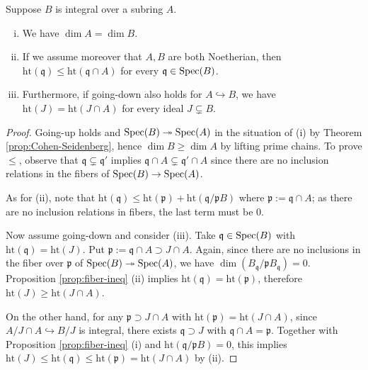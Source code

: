 \begin{proposition}\label{prop:dim-integral}
	Suppose $B$ is integral over a subring $A$.
	\begin{enumerate}[(i)]
		\item We have $\dim A = \dim B$.
		\item If we assume moreover that $A, B$ are both Noetherian, then $\mathrm{ht}(\mathfrak{q}) \leq \mathrm{ht}(\mathfrak{q} \cap A)$ for every $\mathfrak{q} \in \operatorname{Spec}(B)$.
		\item Furthermore, if going-down also holds for $A \hookrightarrow B$, we have $\mathrm{ht}(J) = \mathrm{ht}(J \cap A)$ for every ideal $J \subsetneq B$.
	\end{enumerate}
\end{proposition}
\begin{proof}
	Going-up holds and $\operatorname{Spec}(B) \twoheadrightarrow \operatorname{Spec}(A)$ in the situation of (i) by Theorem \ref{prop:Cohen-Seidenberg}, hence $\dim B \geq \dim A$ by lifting prime chains. To prove $\leq$, observe that $\mathfrak{q} \subsetneq \mathfrak{q}'$ implies $\mathfrak{q} \cap A \subsetneq \mathfrak{q}' \cap A$ since there are no inclusion relations in the fibers of $\operatorname{Spec}(B) \to \operatorname{Spec}(A)$.

	As for (ii), note that $\text{ht}(\mathfrak{q}) \leq \text{ht}(\mathfrak{p}) + \text{ht}(\mathfrak{q}/\mathfrak{p}B)$ where $\mathfrak{p} := \mathfrak{q} \cap A$; as there are no inclusion relations in fibers, the last term must be $0$.
	
	Now assume going-down and consider (iii). Take $\mathfrak{q} \in \operatorname{Spec}(B)$ with $\text{ht}(\mathfrak{q}) = \text{ht}(J)$. Put $\mathfrak{p} := \mathfrak{q} \cap A \supset J \cap A$. Again, since there are no inclusions in the fiber over $\mathfrak{p}$ of $\operatorname{Spec}(B) \twoheadrightarrow \operatorname{Spec}(A)$, we have $\dim(B_{\mathfrak{q}}/ \mathfrak{p}B_{\mathfrak{q}}) = 0$. Proposition \ref{prop:fiber-ineq} (ii) implies $\text{ht}(\mathfrak{q})=\text{ht}(\mathfrak{p})$, therefore $\text{ht}(J) \geq \text{ht}(J \cap A)$.
	
	On the other hand, for any $\mathfrak{p} \supset J \cap A$ with $\text{ht}(\mathfrak{p}) = \text{ht}(J \cap A)$, since $A/J \cap A \hookrightarrow B/J$ is integral, there exists $\mathfrak{q} \supset J$ with $\mathfrak{q} \cap A = \mathfrak{p}$. Together with Proposition \ref{prop:fiber-ineq} (i) and $\mathrm{ht}(\mathfrak{q}/\mathfrak{p}B) = 0$, this implies $\text{ht}(J) \leq \text{ht}(\mathfrak{q}) \leq \text{ht}(\mathfrak{p}) = \text{ht}(J \cap A)$ by (ii).
\end{proof}

